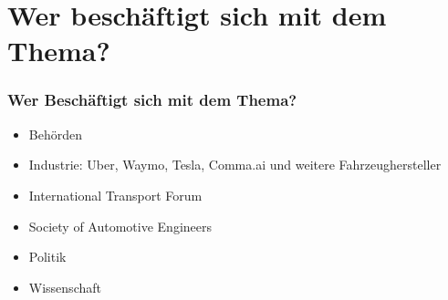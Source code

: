 \section{Wer beschäftigt sich mit dem Thema?}

\begin{frame}
    \frametitle{Wer Beschäftigt sich mit dem Thema?}

    \begin{itemize}
        \item Behörden
        \item Industrie: Uber, Waymo, Tesla, Comma.ai und weitere Fahrzeughersteller
        \item International Transport Forum \cite{websiteITF}
        \item Society of Automotive Engineers \cite{websiteSAE}
        \item Politik
        \item Wissenschaft
    \end{itemize}
\end{frame}